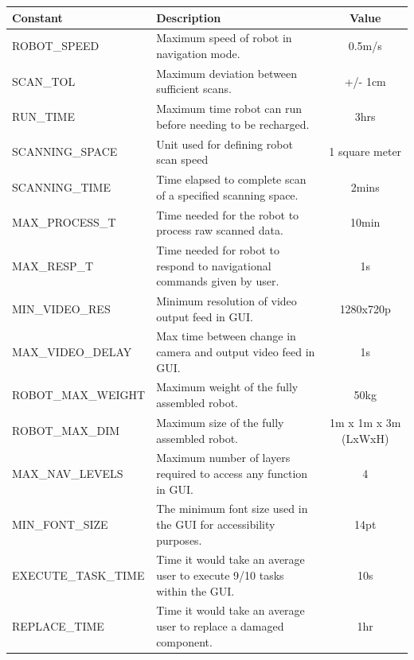 \documentclass[12pt]{article}
\newcommand{\RobotSpeed}{0.5m/s}
\newcommand{\ScanTolerance}{+/- 1cm}
\newcommand{\BatteryLife}{3hrs}
\newcommand{\ScanningSpace}{1 square meter}
\newcommand{\ScanningTime}{2mins}
\newcommand{\MaxProcessingTime}{10min}
\newcommand{\MaxResponseTime}{1s}
\newcommand{\MinVideoResolution}{1280x720p}
\newcommand{\MaxVideoDelay}{1s}
\newcommand{\RobotMaxWeight}{50kg}
\newcommand{\RobotMaxDimensions}{1m x 1m x 3m (LxWxH)}
\newcommand{\MaxNavLevels}{4}
\newcommand{\MinFontSize}{14pt}
\newcommand{\ExecuteTaskTime}{10s}
\newcommand{\ReplaceTime}{1hr}
\begin{document}
\begin{tabular}{ | l | p{6cm} | c |}
  \hline
  \textbf{Constant} & \textbf{Description} & \textbf{Value} \\
  \hline
  ROBOT\_SPEED & Maximum speed of robot in navigation mode. & \RobotSpeed{} \\
  \hline
  SCAN\_TOL & Maximum deviation between sufficient scans. & \ScanTolerance{} \\
  \hline
  RUN\_TIME & Maximum time robot can run before needing to be recharged. & \BatteryLife{} \\
  \hline
  SCANNING\_SPACE & Unit used for defining robot scan speed & \ScanningSpace{} \\
  \hline
  SCANNING\_TIME & Time elapsed to complete scan of a specified scanning space. & \ScanningTime{} \\
  \hline
  MAX\_PROCESS\_T & Time needed for the robot to process raw scanned data. & \MaxProcessingTime{} \\
  \hline
  MAX\_RESP\_T & Time needed for robot to respond to navigational commands given by user. & \MaxResponseTime{} \\
  \hline
  MIN\_VIDEO\_RES & Minimum resolution of video output feed in GUI. & \MinVideoResolution{} \\
  \hline
  MAX\_VIDEO\_DELAY & Max time between change in camera and output video feed in GUI. & \MaxVideoDelay{} \\
  \hline
  ROBOT\_MAX\_WEIGHT & Maximum weight of the fully assembled robot. & \RobotMaxWeight{} \\
  \hline
  ROBOT\_MAX\_DIM & Maximum size of the fully assembled robot. & \RobotMaxDimensions{} \\
  \hline
  MAX\_NAV\_LEVELS & Maximum number of layers required to access any function in GUI. & \MaxNavLevels{} \\
  \hline
  MIN\_FONT\_SIZE & The minimum font size used in the GUI for accessibility purposes. & \MinFontSize{} \\
  \hline
  EXECUTE\_TASK\_TIME & Time it would take an average user to execute 9/10 tasks within the GUI. & \ExecuteTaskTime{} \\
  \hline
  REPLACE\_TIME & Time it would take an average user to replace a damaged component. & \ReplaceTime{} \\
  \hline
  
\end{tabular}
\end{document}

